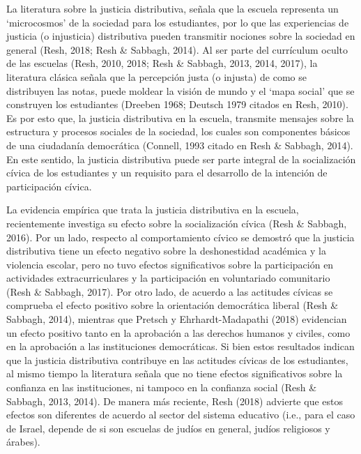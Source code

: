 \documentclass[12pt,twoside]{templates/facsothesis}
\begin{document}
La literatura sobre la justicia distributiva, señala que la escuela representa un `microcosmos' de la sociedad para los estudiantes, por lo que las experiencias de justicia (o injusticia) distributiva pueden transmitir nociones sobre la sociedad en general (Resh, 2018; Resh \& Sabbagh, 2014). Al ser parte del currículum oculto de las escuelas (Resh, 2010, 2018; Resh \& Sabbagh, 2013, 2014, 2017), la literatura clásica señala que la percepción justa (o injusta) de como se distribuyen las notas, puede moldear la visión de mundo y el `mapa social' que se construyen los estudiantes (Dreeben 1968; Deutsch 1979 citados en Resh, 2010). Es por esto que, la justicia distributiva en la escuela, transmite mensajes sobre la estructura y procesos sociales de la sociedad, los cuales son componentes básicos de una ciudadanía democrática (Connell, 1993 citado en Resh \& Sabbagh, 2014). En este sentido, la justicia distributiva puede ser parte integral de la socialización cívica de los estudiantes y un requisito para el desarrollo de la intención de participación cívica.

La evidencia empírica que trata la justicia distributiva en la escuela, recientemente investiga su efecto sobre la socialización cívica (Resh \& Sabbagh, 2016). Por un lado, respecto al comportamiento cívico se demostró que la justicia distributiva tiene un efecto negativo sobre la deshonestidad académica y la violencia escolar, pero no tuvo efectos significativos sobre la participación en actividades extracurriculares y la participación en voluntariado comunitario (Resh \& Sabbagh, 2017). Por otro lado, de acuerdo a las actitudes cívicas se comprueba el efecto positivo sobre la orientación democrática liberal (Resh \& Sabbagh, 2014), mientras que Pretsch y Ehrhardt-Madapathi (2018) evidencian un efecto positivo tanto en la aprobación a las derechos humanos y civiles, como en la aprobación a las instituciones democráticas. Si bien estos resultados indican que la justicia distributiva contribuye en las actitudes cívicas de los estudiantes, al mismo tiempo la literatura señala que no tiene efectos significativos sobre la confianza en las instituciones, ni tampoco en la confianza social (Resh \& Sabbagh, 2013, 2014). De manera más reciente, Resh (2018) advierte que estos efectos son diferentes de acuerdo al sector del sistema educativo (i.e., para el caso de Israel, depende de si son escuelas de judíos en general, judíos religiosos y árabes).
\end{document}
